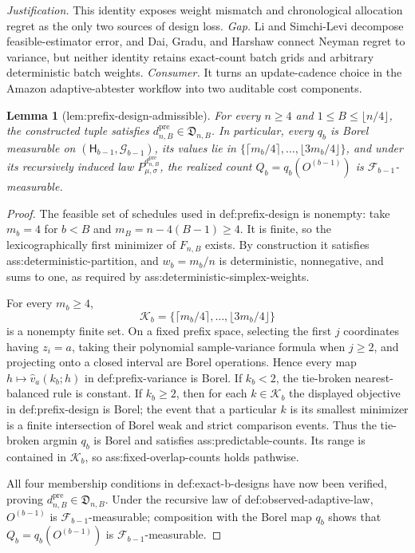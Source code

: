 \documentclass{article}
\newtheorem{lemma}{Lemma}
\begin{document}
\par\smallskip\noindent \textit{Justification.} This identity exposes weight mismatch and chronological allocation regret as the only two sources of design loss. \textit{Gap.} Li and Simchi-Levi decompose feasible-estimator error, and Dai, Gradu, and Harshaw connect Neyman regret to variance, but neither identity retains exact-count batch grids and arbitrary deterministic batch weights. \textit{Consumer.} It turns an update-cadence choice in the Amazon adaptive-abtester workflow into two auditable cost components.

\begin{lemma}[lem:prefix-design-admissible]\label{lem:prefix-design-admissible}
For every \(n\ge4\) and \(1\le B\le\lfloor n/4\rfloor\), the constructed tuple satisfies \(d^{\mathrm{pre}}_{n,B}\in\mathfrak D_{n,B}\). In particular, every \(q_b\) is Borel measurable on \((\mathsf H_{b-1},\mathcal G_{b-1})\), its values lie in \(\{\lceil m_b/4\rceil,\ldots,\lfloor3m_b/4\rfloor\}\), and under its recursively induced law \(P^{d^{\mathrm{pre}}_{n,B}}_{\mu,\sigma}\), the realized count \(Q_b=q_b(O^{(b-1)})\) is \(\mathcal F_{b-1}\)-measurable.
\end{lemma}
\begin{proof}
The feasible set of schedules used in def:prefix-design is nonempty: take \(m_b=4\) for \(b<B\) and \(m_B=n-4(B-1)\geq4\).  It is finite, so the lexicographically first minimizer of \(F_{n,B}\) exists.  By construction it satisfies ass:deterministic-partition, and \(w_b=m_b/n\) is deterministic, nonnegative, and sums to one, as required by ass:deterministic-simplex-weights.

For every \(m_b\geq4\),
\[
\mathcal K_b=\{\lceil m_b/4\rceil,\ldots,\lfloor3m_b/4\rfloor\}
\]
is a nonempty finite set.  On a fixed prefix space, selecting the first \(j\) coordinates having \(z_i=a\), taking their polynomial sample-variance formula when \(j\geq2\), and projecting onto a closed interval are Borel operations.  Hence every map \(h\mapsto\widehat v_a(k_b;h)\) in def:prefix-variance is Borel.  If \(k_b<2\), the tie-broken nearest-balanced rule is constant.  If \(k_b\geq2\), then for each \(k\in\mathcal K_b\) the displayed objective in def:prefix-design is Borel; the event that a particular \(k\) is its smallest minimizer is a finite intersection of Borel weak and strict comparison events.  Thus the tie-broken argmin \(q_b\) is Borel and satisfies ass:predictable-counts.  Its range is contained in \(\mathcal K_b\), so ass:fixed-overlap-counts holds pathwise.

All four membership conditions in def:exact-b-designs have now been verified, proving \(d^{\mathrm{pre}}_{n,B}\in\mathfrak D_{n,B}\).  Under the recursive law of def:observed-adaptive-law, \(O^{(b-1)}\) is \(\mathcal F_{b-1}\)-measurable; composition with the Borel map \(q_b\) shows that \(Q_b=q_b(O^{(b-1)})\) is \(\mathcal F_{b-1}\)-measurable.
\end{proof}
\end{document}
